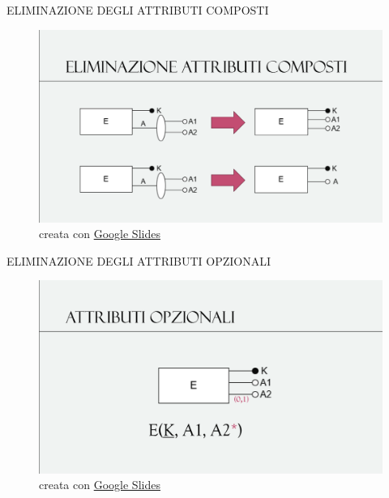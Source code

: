 \documentclass[aspectratio=1610]{beamer}
\begin{document}
\begin{frame}{ELIMINAZIONE DEGLI ATTRIBUTI COMPOSTI}
    \begin{figure}
        \includegraphics[width=\linewidth]{img/attrComposti.png}
        \caption{{creata con \href{https://docs.google.com/presentation/}{Google Slides}}}
    \end{figure}
\end{frame}

\begin{frame}{ELIMINAZIONE DEGLI ATTRIBUTI OPZIONALI}
    \begin{figure}
        \includegraphics[width=\linewidth]{img/attrOpzionali.png}
        \caption{{creata con \href{https://docs.google.com/presentation/}{Google Slides}}}
    \end{figure}
\end{frame}
\end{document}
